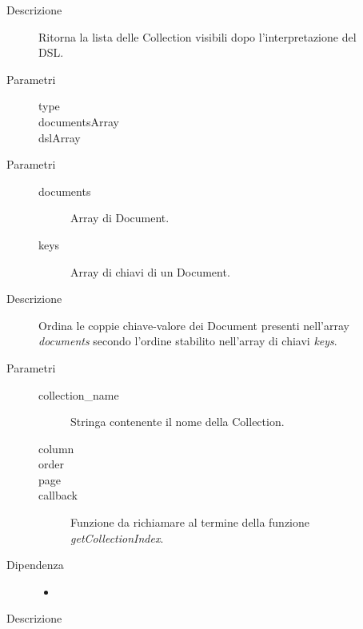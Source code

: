 \begin{description}
\begin{mldescription}
\begin{description}
\begin{itemize}
					
				\end{itemize}
			\item[Descrizione] \hfill
			Ritorna la lista delle Collection visibili dopo l'interpretazione del DSL. 
		\end{description}
		
	
	 \hfill 
		\begin{description}
			\item[Parametri] \hfill
				\begin{description}
					\item[type] \hfill
					\item[documentsArray] \hfill
					\item[dslArray] \hfill
				\end{description}										
		\end{description}
		
	 \hfill 
		\begin{description}
			\item[Parametri] \hfill
				\begin{description}
					\item[documents] \hfill
					Array di Document.
					\item[keys] \hfill
					Array di chiavi di un Document.
				\end{description}
			\item[Descrizione] \hfill
			Ordina le coppie chiave-valore dei Document presenti nell'array \textit{documents} secondo 
			l'ordine stabilito nell'array di chiavi \textit{keys}.
		\end{description}			
	
	 \hfill 
		\begin{description}
			\item[Parametri] \hfill
				\begin{description}
					\item[collection\_name] \hfill
					Stringa contenente il nome della Collection.
					\item[column] \hfill
					
					\item[order] \hfill
					\item[page] \hfill
					\item[callback] \hfill
					Funzione da richiamare al termine della funzione \textit{getCollectionIndex}.
				\end{description}
			\item[Dipendenza] \hfill
				\begin{itemize}
					\item
				\end{itemize}
			\item[Descrizione] \hfill
		\end{description}
	

\end{mldescription}
\end{description}
